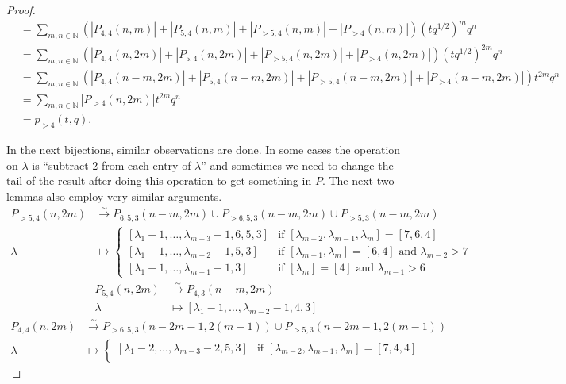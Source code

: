 \documentclass[12pt, reqno]{amsart}
\theoremstyle{remark}
\begin{document}
\begin{proof}
\begin{align*}
    &= \sum_{m, n \in \mathbb{N}}(|P_{4, 4}(n, m)| + |P_{5, 4}(n, m)| + |P_{>5, 4}(n, m)| + |P_{>4}(n, m)|)(tq^{1/2})^mq^n \\
    &= \sum_{m, n \in \mathbb{N}}(|P_{4, 4}(n, 2m)| + |P_{5, 4}(n, 2m)| + |P_{>5, 4}(n, 2m)| + |P_{>4}(n, 2m)|)(tq^{1/2})^{2m}q^n \\
    &= \sum_{m, n \in \mathbb{N}}(|P_{4, 4}(n - m, 2m)| + |P_{5, 4}(n - m, 2m)| + |P_{>5, 4}(n - m, 2m)| + |P_{>4}(n - m, 2m)|)t^{2m}q^n \\
    &= \sum_{m, n \in \mathbb{N}}|P_{>4}(n, 2m)|t^{2m}q^n \\
    &= p_{>4}(t, q).
  \end{align*}
  
  In the next bijections, similar observations are done.
  In some cases the operation on $\lambda$ is ``subtract 2 from each entry of $\lambda$'' and sometimes we need to change the tail of the result after doing this operation to get something in $P$.
  The next two lemmas also employ very similar arguments.
  \begin{align*}
    P_{>5, 4}(n, 2m) &\xrightarrow{\sim} P_{6, 5, 3}(n - m, 2m) \cup P_{>6, 5, 3}(n - m, 2m) \cup P_{>5, 3}(n - m, 2m) \\
    \lambda &\mapsto
              \begin{cases}
                [\lambda_1 - 1, \dots, \lambda_{m - 3} - 1, 6, 5, 3] &\text{if }[\lambda_{m - 2}, \lambda_{m - 1}, \lambda_m] = [7, 6, 4] \\
                [\lambda_1 - 1, \dots, \lambda_{m - 2} - 1, 5, 3] &\text{if }[\lambda_{m - 1}, \lambda_m] = [6, 4]\text{ and }\lambda_{m - 2} > 7 \\
                [\lambda_1 - 1, \dots, \lambda_{m - 1} - 1, 3] &\text{if }[\lambda_m] = [4]\text{ and }\lambda_{m - 1} > 6
              \end{cases}
  \end{align*}
  \begin{align*}
    P_{5, 4}(n, 2m) &\xrightarrow{\sim} P_{4, 3}(n - m, 2m) \\
    \lambda &\mapsto [\lambda_1 - 1, \dots, \lambda_{m - 2} - 1, 4, 3]
  \end{align*}
  \begin{align*}
    P_{4, 4}(n, 2m) &\xrightarrow{\sim} P_{>6, 5, 3}(n - 2m - 1, 2(m - 1)) \cup P_{>5, 3}(n - 2m - 1, 2(m - 1)) \\
    \lambda &\mapsto
              \begin{cases}
                [\lambda_1 - 2, \dots, \lambda_{m - 3} - 2, 5, 3] &\text{if }[\lambda_{m - 2}, \lambda_{m - 1}, \lambda_m] = [7, 4, 4] \\

\end{cases}
\end{align*}
\end{proof}
\end{document}
